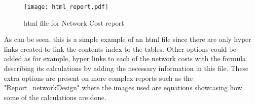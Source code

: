 \documentclass[12pt, a4paper]{article}
\begin{document}
	\begin{figure}[h!]
		\centering
		\texttt{[image: html\_report.pdf]}
		\caption{html file for Network Cost report}
		\label{html_report}
	\end{figure}	
		
	As can be seen, this is a simple example of an html file since there are only hyper links created to link the contents index to the tables. Other options could be added as for example, hyper links to each of the network costs with the formula describing its calculations by adding the necessary information in this file. These extra options are present on more complex reports such as the "Report\_networkDesign" where the images used are equations showcasing how some of the calculations are done.
	
\clearpage
\end{document}
